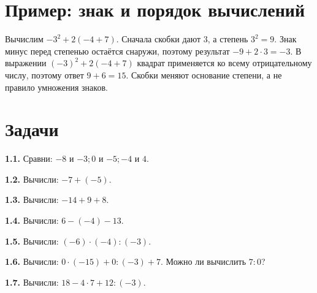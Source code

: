 \section{Пример: знак и порядок вычислений}
\begin{example}Вычислим \(-3^2+2(-4+7)\). Сначала скобки дают \(3\), а степень \(3^2=9\). Знак минус перед степенью остаётся снаружи, поэтому результат \(-9+2\cdot3=-3\). В выражении \((-3)^2+2(-4+7)\) квадрат применяется ко всему отрицательному числу, поэтому ответ \(9+6=15\). Скобки меняют основание степени, а не правило умножения знаков.\end{example}
\section*{Задачи}
\begingroup\setlength{\parskip}{2pt}
\noindent\begin{minipage}[t]{\linewidth}\textbf{1.1.} Сравни: \(- 8\) и \(- 3;\allowbreak 0\) и \(- 5;\allowbreak - 4\) и \(4\).\par\end{minipage}\par
\noindent\begin{minipage}[t]{\linewidth}\textbf{1.2.} Вычисли: \(- 7 + (- 5)\).\par\end{minipage}\par
\noindent\begin{minipage}[t]{\linewidth}\textbf{1.3.} Вычисли: \(- 14 + 9 + 8\).\par\end{minipage}\par
\noindent\begin{minipage}[t]{\linewidth}\textbf{1.4.} Вычисли: \(6 - (- 4) - 13\).\par\end{minipage}\par
\noindent\begin{minipage}[t]{\linewidth}\textbf{1.5.} Вычисли: \((- 6) \cdot  (- 4) : (- 3)\).\par\end{minipage}\par
\noindent\begin{minipage}[t]{\linewidth}\textbf{1.6.} Вычисли: \(0 \cdot  (- 15) + 0 : (- 3) + 7\). Можно ли вычислить \(7 : 0\)?\par\end{minipage}\par
\noindent\begin{minipage}[t]{\linewidth}\textbf{1.7.} Вычисли: \(18 - 4 \cdot  7 + 12 : (- 3)\).\par\end{minipage}\par

